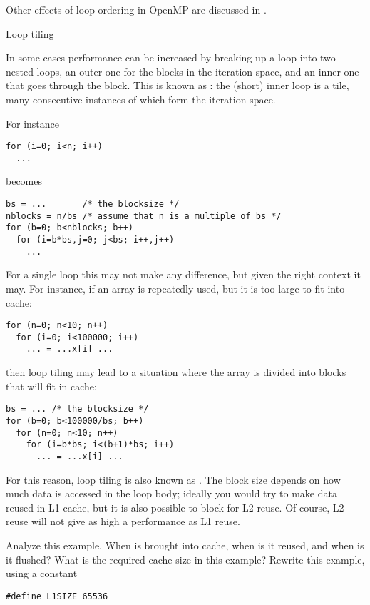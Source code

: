 Other effects of loop ordering in OpenMP are discussed in .


 {Loop tiling}
\label{sec:loop-tiling}

In some cases performance can be increased by breaking up a loop into
two nested loops, an outer one for the blocks in the iteration space,
and an inner one that goes through the block. This is known as
: the (short) inner loop is a tile, many
consecutive instances of which form the iteration space.

For instance
\begin{lstlisting}
for (i=0; i<n; i++)
  ...
\end{lstlisting}
becomes
\begin{lstlisting}
bs = ...       /* the blocksize */
nblocks = n/bs /* assume that n is a multiple of bs */
for (b=0; b<nblocks; b++)
  for (i=b*bs,j=0; j<bs; i++,j++)
    ...
\end{lstlisting}
For a single loop this may not make any difference, but given the
right context it may. For instance, if an array is repeatedly used,
but it is too large to fit into cache:
\begin{lstlisting}
for (n=0; n<10; n++)
  for (i=0; i<100000; i++)
    ... = ...x[i] ...

\end{lstlisting}
then loop tiling may lead to a situation where the array is divided
into blocks that will fit in cache:
\begin{lstlisting}
bs = ... /* the blocksize */
for (b=0; b<100000/bs; b++)
  for (n=0; n<10; n++)
    for (i=b*bs; i<(b+1)*bs; i++)
      ... = ...x[i] ...
\end{lstlisting}
For this reason, loop tiling is also known as
. The block size depends on how much
data is accessed in the loop body; ideally you would try to make data
reused in L1 cache, but it is also possible to block for L2 reuse. Of
course, L2 reuse will not give as high a performance as L1 reuse.

\begin{exercise}
  Analyze this example. When is  brought into cache, when is it
  reused, and when is it flushed? What is the required cache size in
  this example? Rewrite this example, using a constant
\begin{lstlisting}
#define L1SIZE 65536
\end{lstlisting}
\end{exercise}

